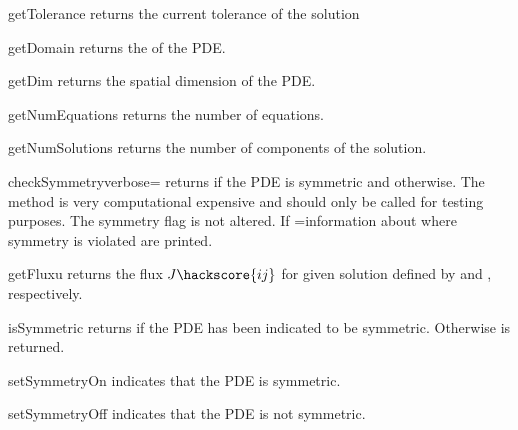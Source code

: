 \begin{methoddesc}[LinearPDE]{getTolerance}{}
returns the current tolerance of the solution
\end{methoddesc}

\begin{methoddesc}[LinearPDE]{getDomain}{}
returns the \Domain of the PDE.
\end{methoddesc}

\begin{methoddesc}[LinearPDE]{getDim}{}
returns the spatial dimension of the PDE.
\end{methoddesc}

\begin{methoddesc}[LinearPDE]{getNumEquations}{}
returns the number of equations.
\end{methoddesc}

\begin{methoddesc}[LinearPDE]{getNumSolutions}{}
returns the number of components of the solution.
\end{methoddesc}

\begin{methoddesc}[LinearPDE]{checkSymmetry}{verbose=\False}
returns \True if the PDE is symmetric and \False otherwise. 
The method is very computational expensive and should only be 
called for testing purposes. The symmetry flag is not altered.
If =\True information about where symmetry is violated
are printed.
\end{methoddesc}

\begin{methoddesc}[LinearPDE]{getFlux}{u}
returns the flux $J\hackscore{ij}$  for given solution 
defined by  and , respectively.
\end{methoddesc}


\begin{methoddesc}[LinearPDE]{isSymmetric}{}
returns \True if the PDE has been indicated to be symmetric.
Otherwise \False is returned.
\end{methoddesc}

\begin{methoddesc}[LinearPDE]{setSymmetryOn}{}
indicates that the PDE is symmetric.
\end{methoddesc}

\begin{methoddesc}[LinearPDE]{setSymmetryOff}{}
indicates that the PDE is not symmetric.
\end{methoddesc}

